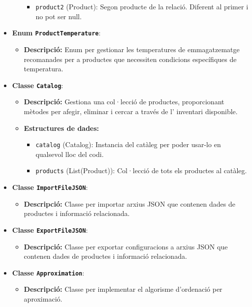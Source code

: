 \documentclass[a4paper,12pt]{report}
\begin{document}
\begin{itemize}
\begin{itemize}
\begin{itemize}
				\item \texttt{product2} (Product): Segon producte de la relació. Diferent al primer i no pot ser null.
			\end{itemize}
		\end{itemize}
		\item \textbf{Enum \texttt{ProductTemperature}}:
		\begin{itemize}
			\item \textbf{Descripció:} Enum per gestionar les temperatures de emmagatzematge recomanades per a productes que necessiten condicions específiques de temperatura.
		\end{itemize}
		\item \textbf{Classe \texttt{Catalog}}:
		\begin{itemize}
			\item \textbf{Descripció:} Gestiona una col·lecció de productes, proporcionant mètodes per afegir, eliminar i cercar a través de l' inventari disponible.
			\item \textbf{Estructures de dades:}
			\begin{itemize}
				\item \texttt{catalog} (Catalog): Instancia del catàleg per poder usar-lo en qualsevol lloc del codi.
				\item \texttt{products} (List(Product)): Col·lecció de tots els productes al catàleg.
			\end{itemize}
		\end{itemize}
		\item \textbf{Classe \texttt{ImportFileJSON}}:
		\begin{itemize}
			\item \textbf{Descripció:} Classe per importar arxius JSON que contenen dades de productes i informació relacionada.
		\end{itemize}
		\item \textbf{Classe \texttt{ExportFileJSON}}:
		\begin{itemize}
			\item \textbf{Descripció:} Classe per exportar configuracions a arxius JSON que contenen dades de productes i informació relacionada.
		\end{itemize}
		\item \textbf{Classe \texttt{Approximation}}:
		\begin{itemize}
			\item \textbf{Descripció:} Classe per implementar el algorisme d'ordenació per aproximació.
		\end{itemize}

\end{itemize}
\end{document}
